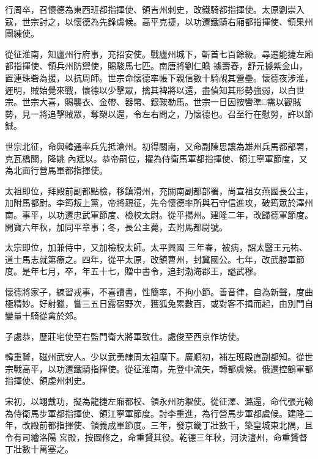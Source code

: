 \begin{pinyinscope}
 行周卒，召懷德為東西班都指揮使、領吉州刺史，改鐵騎都指揮使。太原劉崇入寇，世宗討之，以懷德為先鋒虞候。高平克捷，以功遷鐵騎右廂都指揮使、領果州團練使。



 從征淮南，知廬州行府事，充招安使。戰廬州城下，斬首七百餘級。尋遷能捷左廂都指揮使、領兵州防禦使，賜駿馬七匹。南唐將劉仁贍
 據壽春，舒元據紫金山，置連珠砦為援，以抗周師。世宗命懷德率帳下親信數十騎覘其營壘。懷德夜涉淮，遲明，賊始覺來戰，懷德以少擊眾，擒其裨將以還，盡偵知其形勢強弱，以白世宗。世宗大喜，賜襲衣、金帶、器幣、銀鞍勒馬。世宗一日因按轡準□需以觀賊勢，見一將追擊賊眾，奪槊以還，令左右問之，乃懷德也。召至行在慰勞，許以節鋮。



 世宗北征，命與韓通率兵先抵滄州。初得關南，又命副陳思讓為雄州兵馬都部署，克瓦橋關，降姚
 內斌以。恭帝嗣位，擢為侍衛馬軍都指揮使、領江寧軍節度，又為北面行營馬軍都指揮使。



 太祖即位，拜殿前副都點檢，移鎮滑州，充關南副都部署，尚宣祖女燕國長公主，加附馬都尉。李筠叛上黨，帝將親征，先令懷德率所與石守信進攻，破筠眾於澤州南。事平，以功遷忠武軍節度、檢校太尉。從平揚州。建隆二年，改歸德軍節度。開寶六年秋，加同平章事；冬，長公主薨，去附馬都尉號。



 太宗即位，加兼侍中，又加檢校太師。太平興國
 三年春，被病，詔太醫王元祐、道士馬志就第療之。四年，從平太原，改鎮曹州，封冀國公。七年，改武勝軍節度。是年七月，卒，年五十七，贈中書令，追封渤海郡王，謚武穆。



 懷德將家子，練習戎事，不喜讀書，性簡率，不拘小節。善音律，自為新聲，度曲極精妙。好射獵，嘗三五日露宿野次，獲狐兔累數百，或對客不揖而起，由別門自變量十騎從禽於郊。



 子處恭，歷莊宅使至右監門衛大將軍致仕。處俊至西京作坊使。



 韓重贇，磁州武安人。少以武勇隸周太祖麾下。廣順初，補左班殿直副都知。從世宗戰高平，以功遷鐵騎指揮使。從征淮南，先登中流矢，轉都虞候。俄遷控鶴軍都指揮使、領虔州刺史。



 宋初，以翊戴功，擬為龍捷左廂都校、領永州防禦使。從征澤、潞還，命代張光翰為侍衛馬步軍都指揮使、領江寧軍節度。討李重進，為行營馬步軍都虞候。建隆二年，改殿前都指揮使、領義成軍節度。三年，發京畿丁壯數千，築皇城東北隅，且令有司繪洛陽
 宮殿，按圖修之，命重贇其役。乾德三年秋，河決澶州，命重贇督丁壯數十萬塞之。




\end{pinyinscope}

